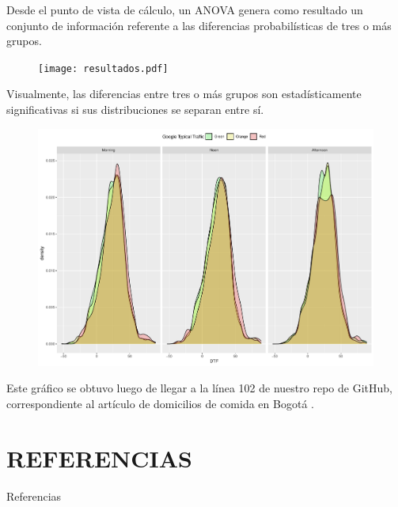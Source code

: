 \documentclass[aspectratio=169]{beamer}
\begin{document}
\begin{frame}
Desde el punto de vista de cálculo, un ANOVA genera como resultado un conjunto de información referente a las diferencias probabilísticas de tres o más grupos. 
\begin{figure}
\centering
\texttt{[image: resultados.pdf]}
\end{figure}
\end{frame}

\begin{frame}
Visualmente, las diferencias entre tres o más grupos son estadísticamente significativas si sus distribuciones se separan entre sí.
\begin{figure}
\centering
\includegraphics[width=.4\textwidth]{Rplot.pdf}
\end{figure}
Este gráfico se obtuvo luego de llegar a la línea 102 de nuestro repo de GitHub, correspondiente al artículo de domicilios de comida en Bogotá \cite{Correa2019}.
\end{frame}



\section*{REFERENCIAS}
\begin{frame}[allowframebreaks]{Referencias}
\tiny{ 


} 
\end{frame}

\pgfdeclareimage[height=0cm,width=0cm]{}{}
 \logo{\pgfuseimage{}}
\beamertemplatenavigationsymbolsempty
\begin{frame}
\end{frame}
\end{document}
